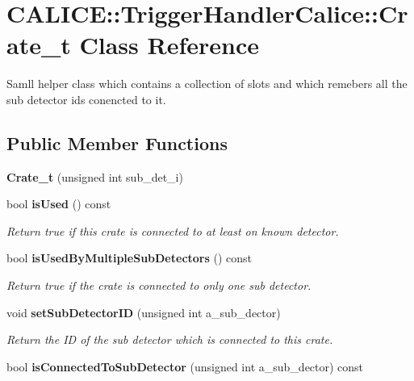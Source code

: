 \section{C\-A\-L\-I\-C\-E\-:\-:Trigger\-Handler\-Calice\-:\-:Crate\-\_\-t Class Reference}
\label{classCALICE_1_1TriggerHandlerCalice_1_1Crate__t}


Samll helper class which contains a collection of slots and which remebers all the sub detector ids conencted to it.  


\subsection*{Public Member Functions}
\begin{DoxyCompactItemize}
\item 
{\bfseries Crate\-\_\-t} (unsigned int sub\-\_\-det\-\_\-i)\label{classCALICE_1_1TriggerHandlerCalice_1_1Crate__t_a42dd3d017eb1e0981e92f1e57f3605c3}

\item 
bool {\bf is\-Used} () const \label{classCALICE_1_1TriggerHandlerCalice_1_1Crate__t_ab0daf2d8f75bf475fb0523c860e6aed1}

\begin{DoxyCompactList}\small\item\em Return true if this crate is connected to at least on known detector. \end{DoxyCompactList}\item 
bool {\bf is\-Used\-By\-Multiple\-Sub\-Detectors} () const \label{classCALICE_1_1TriggerHandlerCalice_1_1Crate__t_a3141c360228a0a289e147c4a285bb42e}

\begin{DoxyCompactList}\small\item\em Return true if the crate is connected to only one sub detector. \end{DoxyCompactList}\item 
void {\bf set\-Sub\-Detector\-I\-D} (unsigned int a\-\_\-sub\-\_\-dector)
\begin{DoxyCompactList}\small\item\em Return the I\-D of the sub detector which is connected to this crate. \end{DoxyCompactList}\item 
bool {\bf is\-Connected\-To\-Sub\-Detector} (unsigned int a\-\_\-sub\-\_\-dector) const \label{classCALICE_1_1TriggerHandlerCalice_1_1Crate__t_a00386bdf45d49e71cd8604393b5abc6a}


\end{DoxyCompactItemize}
